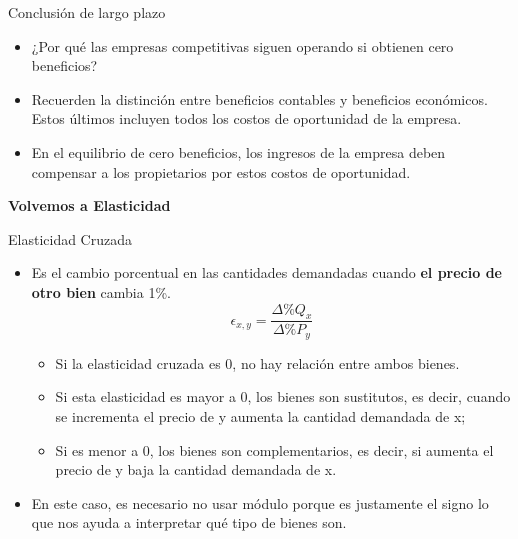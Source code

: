 \documentclass{beamer}
\begin{document}
\begin{frame}{Conclusión de largo plazo}
    \begin{itemize}
        \item ¿Por qué las empresas competitivas siguen operando si obtienen cero beneficios?
        \item Recuerden la distinción entre beneficios contables y beneficios económicos. Estos últimos incluyen todos los costos de oportunidad de la empresa.
        \item En el equilibrio de cero beneficios, los ingresos de la empresa deben compensar a los propietarios por estos costos de oportunidad.
    \end{itemize}
\end{frame}

\begin{frame}
    \centering
    \begin{boxB}
    \centering \Large \textbf{Volvemos a Elasticidad} \\   
    \end{boxB}
\end{frame}

\begin{frame}{Elasticidad Cruzada}
    \begin{itemize}
        \item Es el cambio porcentual en las cantidades demandadas cuando \textbf{el precio de otro bien} cambia 1\%.
        \begin{equation*}
            \epsilon_{x,y} = \frac{\Delta \% Q_x}{\Delta \% P_y}
        \end{equation*}
            \begin{itemize}
            \item Si la elasticidad cruzada es 0, no hay relación entre ambos bienes.
            \item Si esta elasticidad es mayor a 0, los bienes son sustitutos, es decir, cuando se incrementa el precio de y aumenta la cantidad demandada de x; 
            \item Si es menor a 0, los bienes son complementarios, es decir, si aumenta el precio de y baja la cantidad demandada de x.
            \end{itemize}
        \item En este caso, es necesario no usar módulo porque es justamente el signo lo que nos ayuda a interpretar qué tipo de bienes son.
    \end{itemize}
\end{frame}
\end{document}

